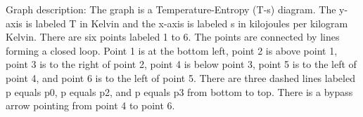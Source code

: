 Graph description:
The graph is a Temperature-Entropy (T-s) diagram. The y-axis is labeled T in Kelvin and the x-axis is labeled s in kilojoules per kilogram Kelvin. There are six points labeled 1 to 6. The points are connected by lines forming a closed loop. Point 1 is at the bottom left, point 2 is above point 1, point 3 is to the right of point 2, point 4 is below point 3, point 5 is to the left of point 4, and point 6 is to the left of point 5. There are three dashed lines labeled p equals p0, p equals p2, and p equals p3 from bottom to top. There is a bypass arrow pointing from point 4 to point 6.